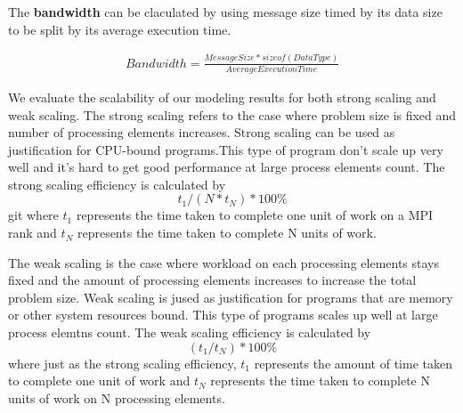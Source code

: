 The \textbf{bandwidth} can be claculated by using message size timed by its data size to be split by its average execution time.

\begin{equation*}
    \begin{aligned}
        Bandwidth = \frac{MessageSize * sizeof(DataType)} {AverageExecutionTime}
    \end{aligned}
\end{equation*}

We evaluate the scalability of our modeling results for both strong scaling and weak scaling. The strong scaling refers to the case where problem size is fixed and number of processing elements increases. Strong scaling can be used as justification for CPU-bound programs.This type of program don't scale up very well and it's hard to get good performance at large process elements count. The strong scaling efficiency is calculated by
\begin{equation*}
t_1 / ( N * t_N ) * 100\% 
\end{equation*}git 
where $t_1$ represents the time taken to complete one unit of work on a MPI rank and $t_N$ represents the time taken to complete N units of work. 

The weak scaling is the case where workload on each processing elements stays fixed and the amount of processing elements increases to increase the total problem size. Weak scaling is jused as justification for programs that are memory or other system resources bound. This type of programs scales up well at large process elemtns count. The weak scaling efficiency is calculated by
\begin{equation*}
( t_1 / t_N ) * 100\% 
\end{equation*}
where just as the strong scaling efficiency, $t_1$ represents the amount of time taken to complete one unit of work and $t_N$ represents the time taken to complete N units of work on N processing elements.
